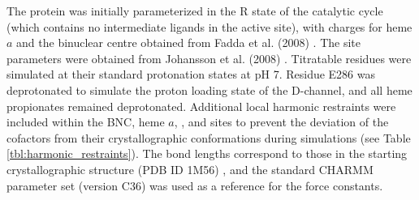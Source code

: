 The protein was initially parameterized in the R state of the catalytic cycle (which contains no intermediate ligands in the active site), with charges for heme $a$ and the binuclear centre obtained from Fadda et al. (2008) \cite{Fadda:2008p5482}. The  site parameters were obtained from Johansson et al. (2008) \cite{Johansson:2008p5653}. Titratable residues were simulated at their standard protonation states at pH 7. Residue E286 was deprotonated to simulate the proton loading state of the D-channel, and all heme propionates remained deprotonated. Additional local harmonic restraints were included within the BNC, heme $a$, , and  sites to prevent the deviation of the cofactors from their crystallographic conformations during simulations (see Table \ref{tbl:harmonic_restraints}). The bond lengths correspond to those in the starting crystallographic structure (PDB ID 1M56) \cite{SvenssonEk:2002p5595}, and the standard CHARMM parameter set (version C36) was used as a reference for the force constants.

